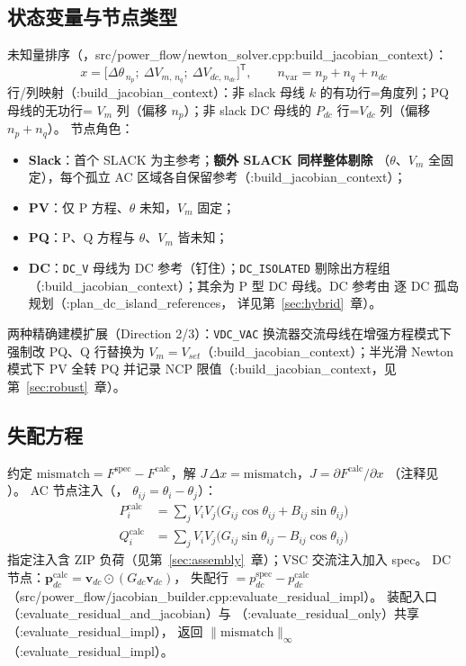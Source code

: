 \subsection{状态变量与节点类型}
未知量排序（，src/power\_flow/newton\_solver.cpp:build\_jacobian\_context）：
\[
x=\big[\Delta\theta_{\,n_p};\ \Delta V_{m,\,n_q};\ \Delta V_{dc,\,n_{dc}}\big]^{\mathsf T},
\qquad n_{\mathrm{var}}=n_p+n_q+n_{dc}
\]
行/列映射（:build\_jacobian\_context）：非 slack 母线 $k$ 的有功行=角度列；PQ 母线的无功行=
$V_m$ 列（偏移 $n_p$）；非 slack DC 母线的 $P_{dc}$ 行=$V_{dc}$ 列（偏移 $n_p+n_q$）。
节点角色：
\begin{itemize}
  \item \textbf{Slack}：首个 SLACK 为主参考；\textbf{额外 SLACK 同样整体剔除}
        （$\theta$、$V_m$ 全固定），每个孤立 AC 区域各自保留参考（:build\_jacobian\_context）；
  \item \textbf{PV}：仅 P 方程、$\theta$ 未知，$V_m$ 固定；
  \item \textbf{PQ}：P、Q 方程与 $\theta$、$V_m$ 皆未知；
  \item \textbf{DC}：\texttt{DC\_V} 母线为 DC 参考（钉住）；\texttt{DC\_ISOLATED}
        剔除出方程组（:build\_jacobian\_context）；其余为 P 型 DC 母线。DC 参考由
         逐 DC 孤岛规划（:plan\_dc\_island\_references，
        详见第~\ref{sec:hybrid}~章）。
\end{itemize}
两种精确建模扩展（Direction 2/3）：\texttt{VDC\_VAC} 换流器交流母线在增强方程模式下
强制改 PQ、Q 行替换为 $V_m=V_{set}$（:build\_jacobian\_context）；半光滑 Newton 模式下
PV 全转 PQ 并记录 NCP 限值（:build\_jacobian\_context，见第~\ref{sec:robust}~章）。

\subsection{失配方程}
约定 $\mathrm{mismatch}=F^{\mathrm{spec}}-F^{\mathrm{calc}}$，解
$J\,\Delta x=\mathrm{mismatch}$，$J=\partial F^{\mathrm{calc}}/\partial x$
（注释见 ）。
AC 节点注入（，
$\theta_{ij}=\theta_i-\theta_j$）：
\begin{align*}
P_i^{\mathrm{calc}}&=\sum_{j}V_iV_j\big(G_{ij}\cos\theta_{ij}+B_{ij}\sin\theta_{ij}\big)\\
Q_i^{\mathrm{calc}}&=\sum_{j}V_iV_j\big(G_{ij}\sin\theta_{ij}-B_{ij}\cos\theta_{ij}\big)
\end{align*}
指定注入含 ZIP 负荷（见第~\ref{sec:assembly}~章）；VSC 交流注入加入 spec。
DC 节点：$\mathbf p_{dc}^{\mathrm{calc}}=\mathbf v_{dc}\odot(G_{dc}\mathbf v_{dc})$，
失配行 $=p_{dc}^{\mathrm{spec}}-p_{dc}^{\mathrm{calc}}$（src/power\_flow/jacobian\_builder.cpp:evaluate\_residual\_impl）。
装配入口 （:evaluate\_residual\_and\_jacobian）与
（:evaluate\_residual\_only）共享 （:evaluate\_residual\_impl），
返回 $\lVert\mathrm{mismatch}\rVert_\infty$（:evaluate\_residual\_impl）。

